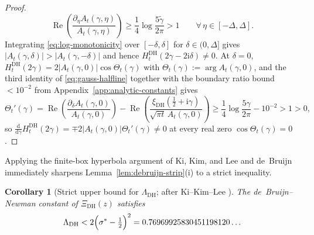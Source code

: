 \documentclass[11pt,a4paper,reqno]{amsart}
\newtheorem{corollary}[theorem]{Corollary}
\theoremstyle{definition}
\theoremstyle{remark}
\numberwithin{equation}{section}
\newcommand{\dd}{\mathrm{d}}
\newcommand{\ii}{\mathrm{i}}
\DeclareMathOperator{\Reop}{Re}
\begin{document}
\begin{proof}
\begin{equation}
  \Reop\!\left(\frac{\partial_\eta A_t(\gamma,\eta)}{A_t(\gamma,\eta)}\right)
  \ge \frac{1}{4}\log\frac{5\tilde{\gamma}}{2\pi} > 1
  \qquad \forall\,\eta \in [-\Delta,\Delta].
  \label{eq:log-monotonicity}
\end{equation}
Integrating \eqref{eq:log-monotonicity} over $[-\delta, \delta]$ for $\delta \in (0, \Delta]$ gives $|A_t(\gamma,\delta)| > |A_t(\gamma,-\delta)|$ and hence $H_t^{\mathrm{DH}}(2\gamma - 2\ii\delta) \ne 0$. At $\delta = 0$, $H_t^{\mathrm{DH}}(2\gamma) = 2|A_t(\gamma,0)|\cos\Theta_t(\gamma)$ with $\Theta_t(\gamma) := \arg A_t(\gamma,0)$, and the third identity of \eqref{eq:gauss-halfline} together with the boundary ratio bound $< 10^{-2}$ from Appendix~\ref{app:analytic-constants} gives
\begin{equation}
  \Theta_t'(\gamma)
  = \Reop\!\left(\frac{\partial_\delta A_t(\gamma,0)}{A_t(\gamma,0)}\right) - \Reop\!\left(\frac{\xi_{\mathrm{DH}}(\frac{1}{2}+\ii\gamma)}{\sqrt{\pi t}\,A_t(\gamma,0)}\right)
  \ge \frac{1}{4}\log\frac{5\gamma}{2\pi} - 10^{-2} > 1 > 0,
  \label{eq:theta-prime-pos}
\end{equation}
so $\frac{\dd}{\dd\gamma}H_t^{\mathrm{DH}}(2\gamma) = \mp 2|A_t(\gamma,0)|\Theta_t'(\gamma) \ne 0$ at every real zero $\cos\Theta_t(\gamma) = 0$.
\end{proof}

Applying the finite-box hyperbola argument of Ki, Kim, and Lee \cite[\S 3]{kikimlee2009} and de~Bruijn \cite[Thm.~12]{debruijn1950} immediately sharpens Lemma~\ref{lem:debruijn-strip}(i) to a strict inequality.

\begin{corollary}[{Strict upper bound for $\Lambda_{\mathrm{DH}}$; after Ki--Kim--Lee \cite{kikimlee2009}}]
\label{cor:strict-upper-bound}
The de~Bruijn--Newman constant of $\Xi_{\mathrm{DH}}(z)$ satisfies
\begin{equation}
  \Lambda_{\mathrm{DH}} < 2\Bigl(\sigma^* - \tfrac{1}{2}\Bigr)^2 = 0.76969925830451198120\ldots
  \label{eq:strict-upper}
\end{equation}
\end{corollary}
\end{document}
